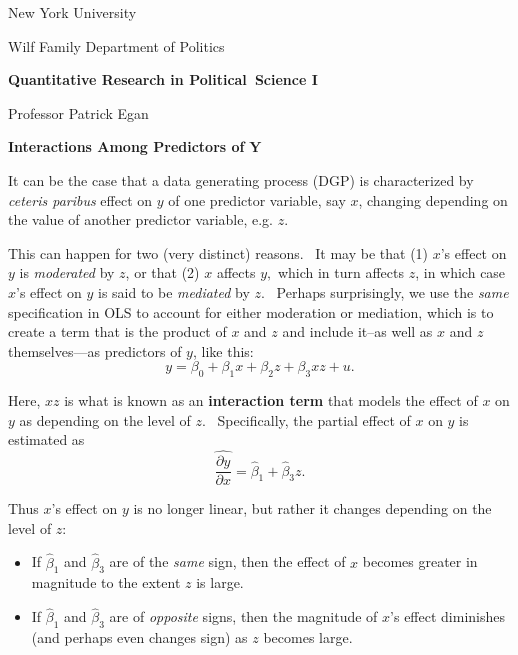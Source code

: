 \documentclass[11pt]{article}
\begin{document}
New York University

Wilf Family Department of Politics

\begin{center}
{\large \textbf{Quantitative Research in Political\ Science I}}

Professor Patrick Egan

\bigskip

\textbf{Interactions Among Predictors of }$\mathbf{Y}$\bigskip
\end{center}

It can be the case that a data generating process (DGP) is characterized by 
\textit{ceteris paribus} effect on $y$ of one predictor variable, say $x$,
changing depending on the value of another predictor variable, e.g. $z$. \ 

This can happen for two (very distinct) reasons. \ It may be that (1) $x$'s
effect on $y$ is \textit{moderated }by $z$, or that (2) $x$ affects $y,$
which in turn affects $z$, in which case $x$'s effect on $y$ is said to be 
\textit{mediated }by $z$. \ Perhaps surprisingly, we use the \textit{same }%
specification in OLS to account for either moderation or mediation, which is
to create a term that is the product of $x$ and $z$ and include it--as well
as $x$ and $z$ themselves---as predictors of $y$, like this:%
\begin{equation*}
y=\beta _{0}+\beta _{1}x+\beta _{2}z+\beta _{3}xz+u.
\end{equation*}

Here, $xz$ is what is known as an \textbf{interaction term }that models the
effect of $x$ on $y$ as depending on the level of $z$. \ Specifically, the
partial effect of $x$ on $y$ is estimated as%
\begin{equation*}
\widehat{\frac{\partial y}{\partial x}}=\widehat{\beta }_{1}+\widehat{\beta }%
_{3}z.
\end{equation*}

Thus $x$'s effect on $y$ is no longer linear, but rather it changes
depending on the level of $z$:

\begin{itemize}
\item If $\widehat{\beta }_{1}$ and $\widehat{\beta }_{3}$ are of the 
\textit{same} sign, then the effect of $x$ becomes greater in magnitude to
the extent $z$ is large. \ 

\item If $\widehat{\beta }_{1}$ and $\widehat{\beta }_{3}$ are of \textit{%
opposite} signs, then the magnitude of $x$'s effect diminishes (and perhaps
even changes sign) as $z$ becomes large.\bigskip
\end{itemize}
\end{document}
